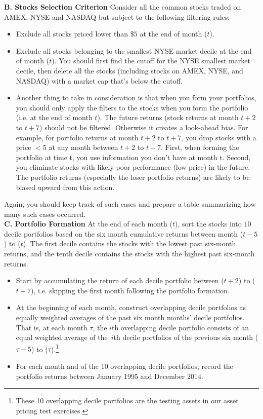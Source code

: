 \textbf{B. Stocks Selection Criterion}
Consider all the common stocks traded on AMEX, NYSE and NASDAQ but
subject to the following filtering rules:
	\begin{itemize}
	\item Exclude all stocks priced lower than $\$5$ at the end of month ($t$).
	\item Exclude all stocks belonging to the smallest NYSE market decile at the end of month ($t$). You should first find the cutoff for the NYSE smallest market decile, then delete all the stocks (including stocks on AMEX, NYSE, and NASDAQ) with a market cap that's below the cutoff.
	\item Another thing to take in consideration is that when you form your portfolios, you should only apply the filters to the stocks when you form the portfolio (i.e. at the end of month $t$). The future returns (stock returns at month $t+2$ to $t+7$) should not be filtered. Otherwise it creates a look-ahead bias. For example, for portfolio returns at month $t+2$ to $t+7$, you drop stocks with a price $<$5 at any month between $t+2$ to $t+7$. First, when forming the portfolio at time t, you use information you don't have at month t. Second, you eliminate stocks with likely poor performance (low price) in the future. The portfolio returns (especially the loser portfolio returns) are likely to be biased upward from this action. \\
\end{itemize}


Again, you should keep track of such cases and prepare a table summarizing how many such cases occurred. \\

\textbf{C. Portfolio Formation}
At the end of each month ($t$), sort the stocks into $10$ decile portfolios based on the six month cumulative returns between month ($t-5$) to ($t$). The first decile contains the stocks with the lowest past six-month returns, and the tenth decile contains the stocks with the highest past six-month returns.
	\begin{itemize}
	\item Start by accumulating the return of each decile portfolio between ($%
t+2 $) to ($t+7$), i.e. skipping the first month following the portfolio
formation.
	\item At the beginning of each month, construct overlapping decile portfolios as equally weighted averages of the past six month months' decile portfolios. That is, at each month $\tau $, the $i$th overlapping decile portfolio consists of an equal weighted average of the\ $i$th decile portfolios of the previous six month ($\tau -5$) to ($\tau $).\footnote{These 10 overlapping decile portfolios are the testing assets in our asset
pricing test exercises.}
	\item For each month and of the 10 overlapping decile portfolios, record the portfolio returns between January 1995 and December 2014. \\
	\end{itemize}

